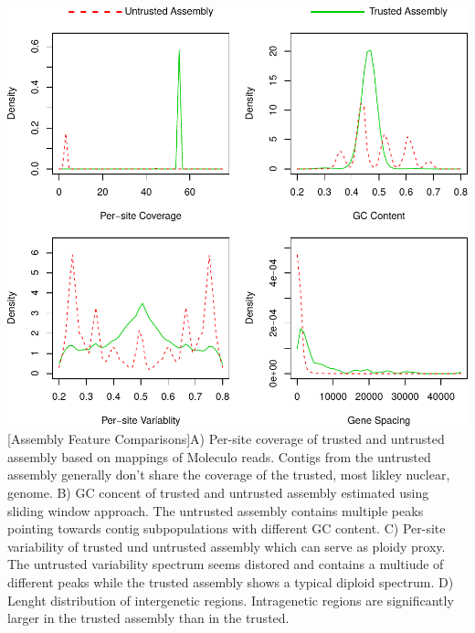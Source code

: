 \documentclass[12pt,a4paper]{scrartcl}
\begin{document}
\includegraphics[width=1\textwidth]{supplementary_figure_2}
[Assembly Feature Comparisons]{A) Per-site coverage of trusted and untrusted assembly based on mappings of Moleculo reads. Contigs from the untrusted assembly generally don't share the coverage of the trusted, most likley nuclear, genome. B) GC concent of trusted and untrusted assembly estimated using sliding window approach. The untrusted assembly contains multiple peaks pointing towards contig subpopulations with different GC content. C) Per-site variability of trusted und untrusted assembly which can serve as ploidy proxy. The untrusted variability spectrum seems distored and contains a multiude of different peaks while the trusted assembly shows a typical diploid spectrum. D) Lenght distribution of intergenetic regions. Intragenetic regions are significantly larger in the trusted assembly than in the trusted.}

\pagebreak
\end{document}
